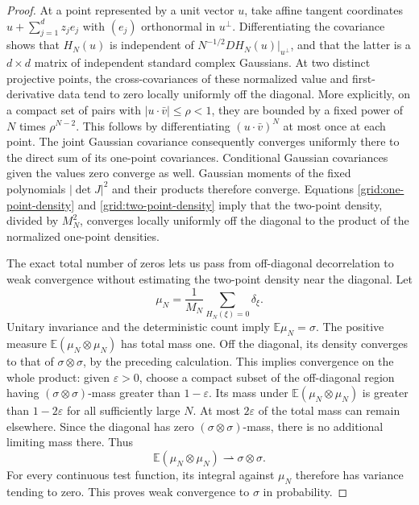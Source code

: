 \begin{proof}
At a point represented by a unit vector $u$, take affine tangent
coordinates $u+\sum_{j=1}^d z_j e_j$ with $(e_j)$ orthonormal in
$u^\perp$.  Differentiating the covariance shows that $H_N(u)$ is
independent of $N^{-1/2}DH_N(u)|_{u^\perp}$, and that the latter is
a $d\times d$ matrix of independent standard complex Gaussians.
At two distinct projective points, the cross-covariances of these
normalized value and first-derivative data tend to zero locally
uniformly off the diagonal.  More explicitly, on a compact set of
pairs with $|u\cdot\bar v|\le\rho<1$, they are bounded by a fixed
power of $N$ times $\rho^{N-2}$.  This follows by differentiating
$(u\cdot\bar v)^N$ at most once at each point.  The joint Gaussian
covariance consequently converges uniformly there to the direct sum
of its one-point covariances.  Conditional Gaussian covariances given
the values zero converge as well.  Gaussian moments of the fixed
polynomials $|\det J|^2$ and their products therefore converge.
Equations \eqref{grid:one-point-density} and
\eqref{grid:two-point-density} imply that the two-point density,
divided by $M_N^2$, converges locally uniformly off the diagonal to
the product of the normalized one-point densities.

The exact total number of zeros lets us pass from off-diagonal
decorrelation to weak convergence without estimating the two-point
density near the diagonal. Let
\[
 \mu_N=\frac1{M_N}\sum_{H_N(\xi)=0}\delta_\xi.
\]
Unitary invariance and the deterministic count imply
$\mathbb E\mu_N=\sigma$.  The positive measure
$\mathbb E(\mu_N\otimes\mu_N)$ has total mass one.  Off the
diagonal, its density converges to that of $\sigma\otimes\sigma$,
by the preceding calculation.  This implies convergence on the
whole product: given $\varepsilon>0$, choose a compact subset of the
off-diagonal region having $(\sigma\otimes\sigma)$-mass greater
than $1-\varepsilon$.  Its mass under
$\mathbb E(\mu_N\otimes\mu_N)$ is greater than $1-2\varepsilon$
for all sufficiently large $N$.  At most $2\varepsilon$ of the
total mass can remain elsewhere.  Since the diagonal has zero
$(\sigma\otimes\sigma)$-mass, there is no additional limiting
mass there.  Thus
\[
 \mathbb E(\mu_N\otimes\mu_N)
       \rightharpoonup\sigma\otimes\sigma.
\]
For every continuous test function, its integral against $\mu_N$
therefore has variance tending to zero.  This proves weak
convergence to $\sigma$ in probability.


\end{proof}

